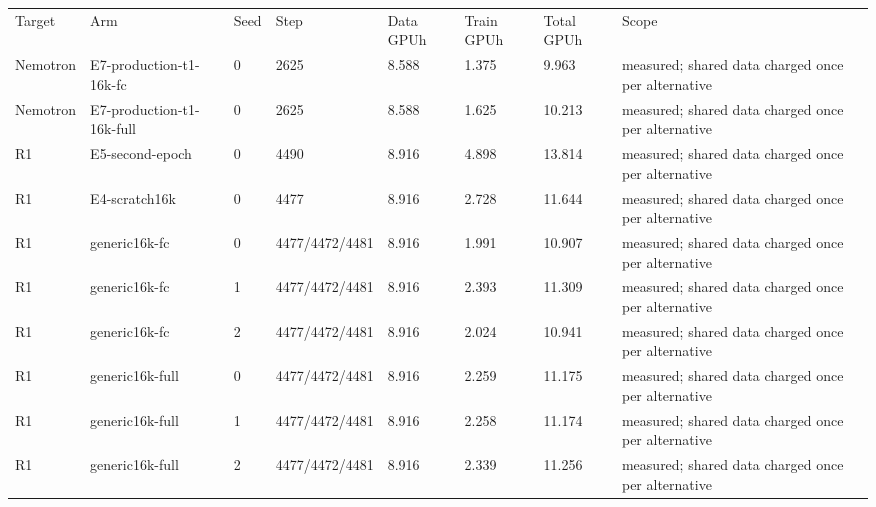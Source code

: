 \begin{tabular}{llllllll}
\hline
Target & Arm & Seed & Step & Data GPUh & Train GPUh & Total GPUh & Scope \\
Nemotron & E7-production-t1-16k-fc & 0 & 2625 & 8.588 & 1.375 & 9.963 & measured; shared data charged once per alternative \\
Nemotron & E7-production-t1-16k-full & 0 & 2625 & 8.588 & 1.625 & 10.213 & measured; shared data charged once per alternative \\
R1 & E5-second-epoch & 0 & 4490 & 8.916 & 4.898 & 13.814 & measured; shared data charged once per alternative \\
R1 & E4-scratch16k & 0 & 4477 & 8.916 & 2.728 & 11.644 & measured; shared data charged once per alternative \\
R1 & generic16k-fc & 0 & 4477/4472/4481 & 8.916 & 1.991 & 10.907 & measured; shared data charged once per alternative \\
R1 & generic16k-fc & 1 & 4477/4472/4481 & 8.916 & 2.393 & 11.309 & measured; shared data charged once per alternative \\
R1 & generic16k-fc & 2 & 4477/4472/4481 & 8.916 & 2.024 & 10.941 & measured; shared data charged once per alternative \\
R1 & generic16k-full & 0 & 4477/4472/4481 & 8.916 & 2.259 & 11.175 & measured; shared data charged once per alternative \\
R1 & generic16k-full & 1 & 4477/4472/4481 & 8.916 & 2.258 & 11.174 & measured; shared data charged once per alternative \\
R1 & generic16k-full & 2 & 4477/4472/4481 & 8.916 & 2.339 & 11.256 & measured; shared data charged once per alternative \\
\hline
\end{tabular}
